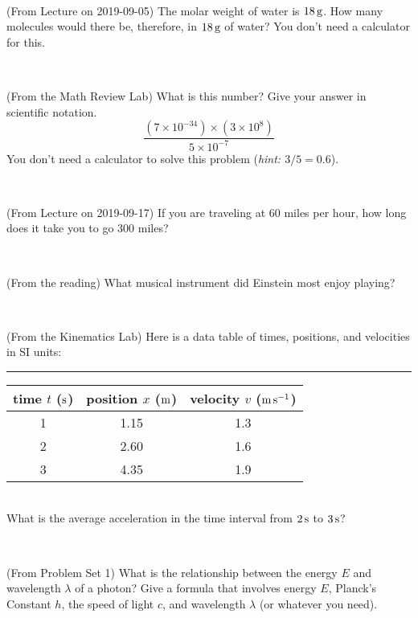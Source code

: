 \documentclass[12pt, letterpaper]{article}
\begin{document}
\vfill ~

\begin{problem} (From Lecture on 2019-09-05)
The molar weight of water is $18\,\mathrm{g}$. How many molecules would there
be, therefore, in $18\,\mathrm{g}$ of water? You don't need a calculator for
this.
\end{problem}


\vfill ~

\begin{problem} (From the Math Review Lab)
What is this number? Give your answer in scientific notation.
$$
\frac{(7\times10^{-34})\times(3\times10^8)}{5\times10^{-7}}
$$
You don't need a calculator to solve this problem (\textit{hint: $3/5=0.6$}).
\end{problem}


\vfill ~


\clearpage


\begin{problem} (From Lecture on 2019-09-17)
If you are traveling at 60 miles per hour, how long does
it take you to go 300 miles?
\end{problem}


\vfill ~

\begin{problem} (From the reading)
What musical instrument did Einstein most enjoy playing?
\end{problem}


\vfill ~

\begin{problem} (From the Kinematics Lab)
Here is a data table of times, positions, and velocities in SI units:\\
\rule{1.0in}{0pt}\begin{tabular}{c|c|c}
time $t$ ($\mathrm{s}$) & position $x$ ($\mathrm{m}$) & velocity $v$ ($\mathrm{m}\,\mathrm{s}^{-1}$) \\
\hline
1 & 1.15 & 1.3 \\
2 & 2.60 & 1.6 \\
3 & 4.35 & 1.9 \\
\hline
\end{tabular}\\
What is the average acceleration in the time interval from $2\,\mathrm{s}$ to $3\,\mathrm{s}$?
\end{problem}


\vfill ~

\begin{problem} (From Problem Set 1)
What is the relationship between the energy $E$ and wavelength
$\lambda$ of a photon? Give a formula that involves energy $E$,
Planck's Constant $h$, the speed of light $c$, and wavelength
$\lambda$ (or whatever you need).
\end{problem}
\end{document}
